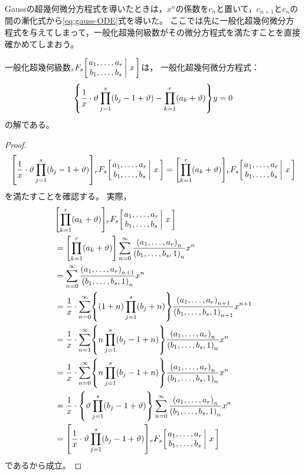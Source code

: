 \documentclass[a4paper,draft]{ltjsarticle}
\begin{document}
Gaussの超幾何微分方程式を導いたときは，$x^n$の係数を$c_n$と置いて，$c_{n+1}$と$c_n$の間の漸化式から\eqref{eq:gauss-ODE}式を導いた。
ここでは先に一般化超幾何微分方程式を与えてしまって，一般化超幾何級数がその微分方程式を満たすことを直接確かめてしまおう。

\begin{thm}
    一般化超幾何級数$\pfq{r}{s}{a_1,\dots,a_r}{b_1,\dots,b_s}{x}$は，
    一般化超幾何微分方程式：
    \begin{equation}
        \label{eq:gauss-一般化超幾何微分方程式}
        \bra{
            \frac{1}{x}\cdot \vartheta\prod_{j=1}^s\pare{b_j-1+\vartheta}-\prod_{k=1}^r\pare{a_k+\vartheta}
        }y=0
    \end{equation}
    の解である。
    \begin{proof}
        \begin{equation}
            \squ{\frac{1}{x}\cdot \vartheta\prod_{j=1}^s\pare{b_j-1+\vartheta}}\pfq{r}{s}{a_1,\dots,a_r}{b_1,\dots,b_s}{x}
            =\squ{\prod_{k=1}^r\pare{a_k+\vartheta}}\pfq{r}{s}{a_1,\dots,a_r}{b_1,\dots,b_s}{x}
        \end{equation}
        を満たすことを確認する。
        実際，
        \begin{align}
            &\squ{\prod_{k=1}^r\pare{a_k+\vartheta}}\pfq{r}{s}{a_1,\dots,a_r}{b_1,\dots,b_s}{x}
            \\
            &=\squ{\prod_{k=1}^r\pare{a_k+\vartheta}}\sum_{n=0}^\infty \frac{\poch{a_1,\dots,a_r}{n}}{\poch{b_1,\dots,b_s,1}{n}}x^n
            \\
            &=\sum_{n=0}^\infty \frac{\poch{a_1,\dots,a_r}{n+1}}{\poch{b_1,\dots,b_s,1}{n}}x^n
            \\
            &=\frac{1}{x}\cdot\sum_{n=0}^\infty\bra{ \pare{1+n}\prod_{j=1}^s\pare{b_j+n}}\frac{\poch{a_1,\dots,a_r}{n+1}}{\poch{b_1,\dots,b_s,1}{n+1}}x^{n+1}
            \\
            &=\frac{1}{x}\cdot \sum_{n=1}^\infty \bra{n\prod_{j=1}^s\pare{b_j-1+n}}\frac{\poch{a_1,\dots,a_r}{n}}{\poch{b_1,\dots,b_s,1}{n}}x^{n}
            \\
            &=\frac{1}{x}\cdot \sum_{n=0}^\infty \bra{n\prod_{j=1}^s\pare{b_j-1+n}}\frac{\poch{a_1,\dots,a_r}{n}}{\poch{b_1,\dots,b_s,1}{n}}x^{n}
            \\
            &=\frac{1}{x}\cdot \bra{\vartheta\prod_{j=1}^s\pare{b_j-1+\vartheta}}\sum_{n=0}^\infty \frac{\poch{a_1,\dots,a_r}{n}}{\poch{b_1,\dots,b_s,1}{n}}x^n
            \\
            &=\squ{\frac{1}{x}\cdot \vartheta\prod_{j=1}^s\pare{b_j-1+\vartheta}}\pfq{r}{s}{a_1,\dots,a_r}{b_1,\dots,b_s}{x}
        \end{align}
        であるから成立。
    \end{proof}
\end{thm}
\end{document}
